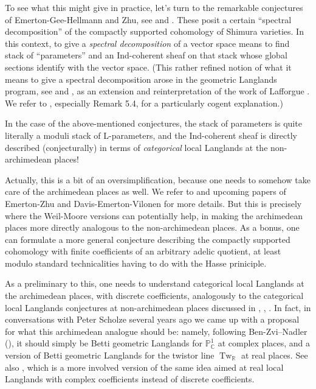 \documentclass[12pt]{article}
\theoremstyle{definition}
\newcommand{\on}{\operatorname}
\newcommand{\mbb}{\mathbb}
\begin{document}
\begin{enumerate}
To see what this might give in practice, let's turn to the remarkable conjectures of Emerton-Gee-Hellmann and Zhu, see \cite{egh} and \cite{zhu}.  These posit a certain ``spectral decomposition'' of the compactly supported cohomology of Shimura varieties.  In this context, to give a \emph{spectral decomposition} of a vector space means to find stack of ``parameters'' and an Ind-coherent sheaf on that stack whose global sections identify with the vector space.  (This rather refined notion of what it means to give a spectral decomposition arose in the geometric Langlands program, see \cite{gaitsgoryshtukas} and \cite{locsysres}, as an extension and reinterpretation of the work of Lafforgue \cite{lafforgue}.  We refer to \cite{scholzebourbaki}, especially Remark 5.4, for a particularly cogent explanation.)

In the case of the above-mentioned conjectures, the stack of parameters is quite literally a moduli stack of L-parameters, and the Ind-coherent sheaf is directly described (conjecturally) in terms of \emph{categorical} local Langlands at the non-archimedean places!

Actually, this is a bit of an oversimplification, because one needs to somehow take care of the archimedean places as well.  We refer to \cite{egh} and upcoming papers of Emerton-Zhu and Davis-Emerton-Vilonen for more details.  But this is precisely where the Weil-Moore versions can potentially help, in making the archimedean places more directly analogous to the non-archimedean places.  As a bonus, one can formulate a more general conjecture describing the compactly supported cohomology with finite coefficients of an arbitrary adelic quotient, at least modulo standard technicalities having to do with the Hasse priniciple.

As a preliminary to this, one needs to understand categorical local Langlands at the archimedean places, with discrete coefficients, analogously to the categorical local Langlands conjectures at non-archimedean places discussed in \cite{farguesscholze}, \cite{zhu}, \cite{egh}.  In fact, in conversations with Peter Scholze several years ago we came up with a proposal for what this archimedean analogue should be: namely, following Ben-Zvi--Nadler (\cite{bznbetti}), it should simply be Betti geometric Langlands for $\mbb{P}^1_{\mbb{C}}$ at complex places, and a version of Betti geometric Langlands for the twistor line $\on{Tw}_{\mbb{R}}$ at real places.  See also \cite{scholzerll}, which is a more involved version of the same idea aimed at real local Langlands with complex coefficients instead of discrete coefficients.


\end{enumerate}
\end{document}
